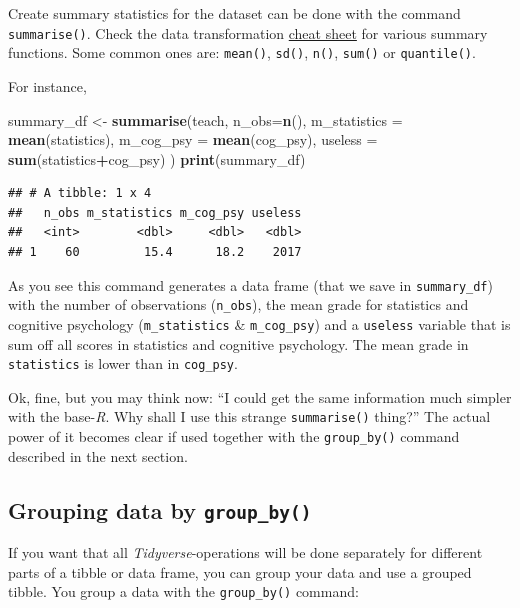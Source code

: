 \documentclass[
]{scrartcl}
\newenvironment{Shaded}{\begin{snugshade}}{\end{snugshade}}
\newcommand{\AttributeTok}[1]{\textcolor[rgb]{0.13,0.29,0.53}{#1}}
\newcommand{\FunctionTok}[1]{\textcolor[rgb]{0.13,0.29,0.53}{\textbf{#1}}}
\newcommand{\NormalTok}[1]{#1}
\newcommand{\OtherTok}[1]{\textcolor[rgb]{0.56,0.35,0.01}{#1}}
\newcommand{\SpecialCharTok}[1]{\textcolor[rgb]{0.81,0.36,0.00}{\textbf{#1}}}
\begin{document}
Create summary statistics for the dataset can be done with the command \texttt{summarise()}. Check the data transformation \hyperref[cheatsheets]{cheat sheet} for various summary functions. Some common ones are: \texttt{mean()}, \texttt{sd()}, \texttt{n()}, \texttt{sum()} or \texttt{quantile()}.

For instance,

\begin{Shaded}
\begin{Highlighting}[]
\NormalTok{summary\_df }\OtherTok{\textless{}{-}} \FunctionTok{summarise}\NormalTok{(teach,}
                \AttributeTok{n\_obs=}\FunctionTok{n}\NormalTok{(),}
                \AttributeTok{m\_statistics =} \FunctionTok{mean}\NormalTok{(statistics),}
                \AttributeTok{m\_cog\_psy =} \FunctionTok{mean}\NormalTok{(cog\_psy),}
                \AttributeTok{useless =} \FunctionTok{sum}\NormalTok{(statistics}\SpecialCharTok{+}\NormalTok{cog\_psy) )}
\FunctionTok{print}\NormalTok{(summary\_df)}
\end{Highlighting}
\end{Shaded}

\begin{verbatim}
## # A tibble: 1 x 4
##   n_obs m_statistics m_cog_psy useless
##   <int>        <dbl>     <dbl>   <dbl>
## 1    60         15.4      18.2    2017
\end{verbatim}

As you see this command generates a data frame (that we save in \texttt{summary\_df}) with the number of observations (\texttt{n\_obs}), the mean grade for statistics and cognitive psychology (\texttt{m\_statistics} \& \texttt{m\_cog\_psy}) and a \texttt{useless} variable that is sum off all scores in statistics and cognitive psychology. The mean grade in \texttt{statistics} is lower than in \texttt{cog\_psy}.

Ok, fine, but you may think now: ``I could get the same information much simpler with the base-\emph{R}. Why shall I use this strange \texttt{summarise()} thing?'' The actual power of it becomes clear if used together with the \texttt{group\_by()} command described in the next section.

\subsection{\texorpdfstring{Grouping data by \texttt{group\_by()}}{Grouping data by group\_by()}}\label{grouping-data-by-group_by}

If you want that all \emph{Tidyverse}-operations will be done separately for different parts of a tibble or data frame, you can group your data and use a grouped tibble. You group a data with the \texttt{group\_by()} command:
\end{document}
